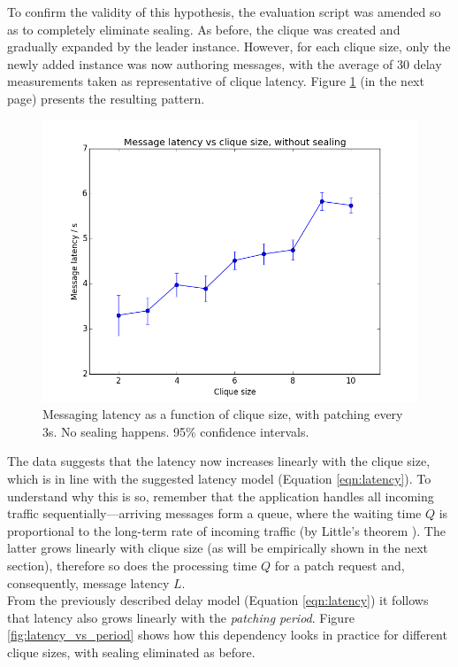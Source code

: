 \documentclass[a4paper, twoside, 12pt]{report}
\begin{document}
To confirm the validity of this hypothesis, the evaluation script was amended so as to completely eliminate sealing. As before, the clique was created and gradually expanded by the leader instance. However, for each clique size, only the newly added instance was now authoring messages, with the average of 30 delay measurements taken as representative of clique latency. Figure \ref{fig:latency_vs_N} (in the next page) presents the resulting pattern.



\begin{figure}[H]
    \captionsetup{width=0.8\textwidth}
    \centering
    \includegraphics[width=0.60\linewidth]{pics/eval/latency_vs_N.png}
    \caption{\label{fig:latency_vs_N} Messaging latency as a function of clique size, with patching every 3s. No sealing happens. 95\% confidence intervals.}
\end{figure}

The data suggests that the latency now increases linearly with the clique size, which is in line with the suggested latency model (Equation \ref{eqn:latency}). To understand why this is so, remember that the application handles all incoming traffic sequentially---arriving messages form a queue, where the waiting time $Q$ is proportional to the long-term rate of incoming traffic (by Little's theorem \cite{little1961proof}). The latter grows linearly with clique size (as will be empirically shown in the next section), therefore so does the processing time $Q$ for a patch request and, consequently, message latency $L$. \\

From the previously described delay model (Equation \ref{eqn:latency}) it follows that latency also grows linearly with the \emph{patching period}. Figure \ref{fig:latency_vs_period} shows how this dependency looks in practice for different clique sizes, with sealing eliminated as before.
\end{document}
